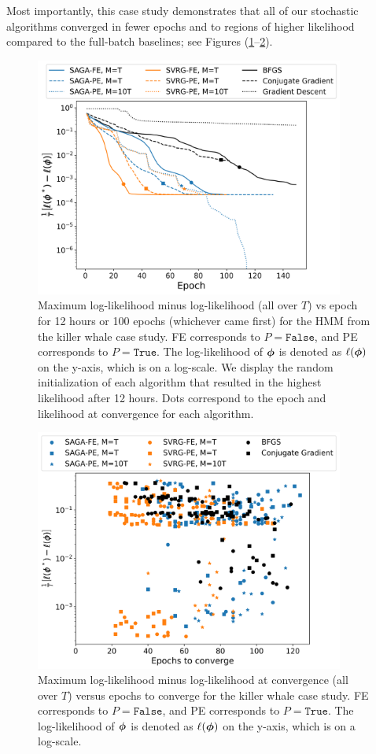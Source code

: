 Most importantly, this case study demonstrates that all of our stochastic algorithms converged in fewer epochs and to regions of higher likelihood compared to the full-batch baselines; see Figures (\ref{fig:ll_trace_case}--\ref{fig:scatterplot_case}).
%
\begin{figure}[h]
    \centering
    \includegraphics[width=4in]{../plt/log-like_v_epoch_K-3-3.png}
    \caption{
    Maximum log-likelihood minus log-likelihood (all over $T$) vs epoch for 12 hours or 100 epochs (whichever came first) for the HMM from the killer whale case study. FE corresponds to $P = \texttt{False}$, and PE corresponds to $P = \texttt{True}$. The log-likelihood of $\boldsymbol{\phi}$ is denoted as $\ell(\boldsymbol{\phi})$ on the y-axis, which is on a log-scale. We display the random initialization of each algorithm that resulted in the highest likelihood after 12 hours. Dots correspond to the epoch and likelihood at convergence for each algorithm.
    }
    \label{fig:ll_trace_case}
\end{figure}
%
\begin{figure}[h]
    \centering
    \includegraphics[width=4in]{../plt/scatterplot_case_study.png}
    \caption{Maximum log-likelihood minus log-likelihood at convergence (all over $T$) versus epochs to converge for the killer whale case study. FE corresponds to $P = \texttt{False}$, and PE corresponds to $P = \texttt{True}$. The log-likelihood of $\boldsymbol{\phi}$ is denoted as $\ell(\boldsymbol{\phi})$ on the y-axis, which is on a log-scale.}
    \label{fig:scatterplot_case}
\end{figure}
